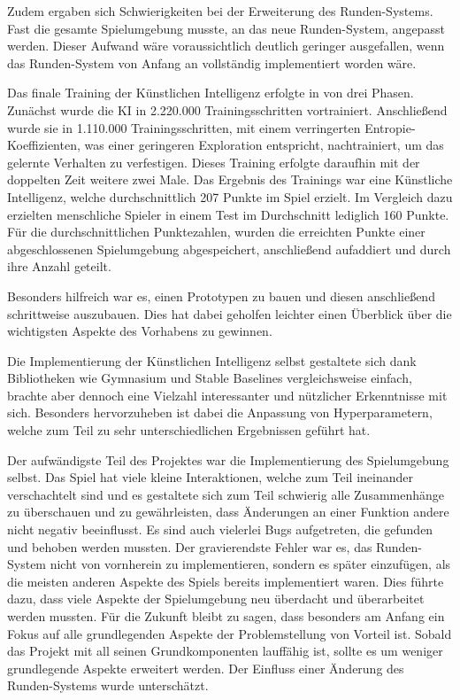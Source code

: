 Zudem ergaben sich Schwierigkeiten bei der Erweiterung des Runden-Systems. Fast die gesamte Spielumgebung musste, an das neue Runden-System, angepasst werden. Dieser Aufwand wäre voraussichtlich deutlich geringer ausgefallen, wenn das Runden-System von Anfang an vollständig implementiert worden wäre.

Das finale Training der Künstlichen Intelligenz erfolgte in von drei Phasen. Zunächst wurde die KI in 2.220.000 Trainingsschritten vortrainiert. Anschließend wurde sie in 1.110.000 Trainingsschritten, mit einem verringerten Entropie-Koeffizienten, was einer geringeren Exploration entspricht, nachtrainiert, um das gelernte Verhalten zu verfestigen. Dieses Training erfolgte daraufhin mit der doppelten Zeit weitere zwei Male. Das Ergebnis des Trainings war eine Künstliche Intelligenz, welche durchschnittlich 207 Punkte im Spiel erzielt. Im Vergleich dazu erzielten menschliche Spieler in einem Test im Durchschnitt lediglich 160 Punkte. Für die durchschnittlichen Punktezahlen, wurden die erreichten Punkte einer abgeschlossenen Spielumgebung abgespeichert, anschließend aufaddiert und durch ihre Anzahl geteilt.

Besonders hilfreich war es, einen Prototypen zu bauen und diesen anschließend schrittweise auszubauen. Dies hat dabei geholfen leichter einen Überblick über die wichtigsten Aspekte des Vorhabens zu gewinnen. 

Die Implementierung der Künstlichen Intelligenz selbst gestaltete sich dank Bibliotheken wie Gymnasium und Stable Baselines vergleichsweise einfach, brachte aber dennoch eine Vielzahl interessanter und nützlicher Erkenntnisse mit sich. Besonders hervorzuheben ist dabei die Anpassung von Hyperparametern, welche zum Teil zu sehr unterschiedlichen Ergebnissen geführt hat. 

Der aufwändigste Teil des Projektes war die Implementierung des Spielumgebung selbst. Das Spiel hat viele kleine Interaktionen, welche zum Teil ineinander verschachtelt sind und es gestaltete sich zum Teil schwierig alle Zusammenhänge zu überschauen und zu gewährleisten, dass Änderungen an einer Funktion andere nicht negativ beeinflusst. Es sind auch vielerlei Bugs aufgetreten, die gefunden und behoben werden mussten. Der gravierendste Fehler war es, das Runden-System nicht von vornherein zu implementieren, sondern es später einzufügen, als die meisten anderen Aspekte des Spiels bereits implementiert waren. Dies führte dazu, dass viele Aspekte der Spielumgebung neu überdacht und überarbeitet werden mussten. Für die Zukunft bleibt zu sagen, dass besonders am Anfang ein Fokus auf alle grundlegenden Aspekte der Problemstellung von Vorteil ist. Sobald das Projekt mit all seinen Grundkomponenten lauffähig ist, sollte es um weniger grundlegende Aspekte erweitert werden. Der Einfluss einer Änderung des Runden-Systems wurde unterschätzt.\\

